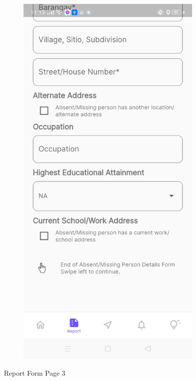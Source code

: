 \begin{figure}[!h]
\begin{subfigure}[c]{0.30\linewidth}
        \centering
        \includegraphics[scale=0.15]{figures/Chapter4/Main/p3-4.jpg}
    \end{subfigure}
    \caption{Report Form Page 3}
    \label{fig:ReportPage3}
\end{figure}

